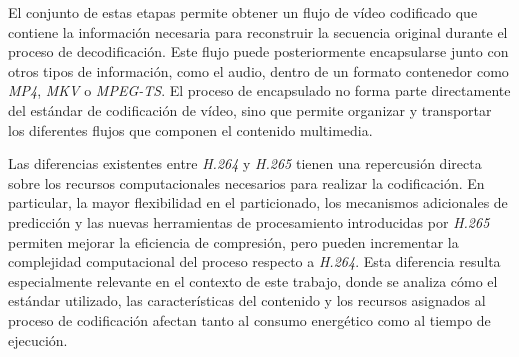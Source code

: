  El conjunto de estas etapas permite obtener un flujo de vídeo codificado que contiene la información necesaria para reconstruir la secuencia original durante el proceso de decodificación. Este flujo puede posteriormente encapsularse junto con otros tipos de información, como el audio, dentro de un formato contenedor como \textit{MP4}, \textit{MKV} o \textit{MPEG-TS}. El proceso de encapsulado no forma parte directamente del estándar de codificación de vídeo, sino que permite organizar y transportar los diferentes flujos que componen el contenido multimedia.
 
 Las diferencias existentes entre \textit{H.264} y \textit{H.265} tienen una repercusión directa sobre los recursos computacionales necesarios para realizar la codificación. En particular, la mayor flexibilidad en el particionado, los mecanismos adicionales de predicción y las nuevas herramientas de procesamiento introducidas por \textit{H.265} permiten mejorar la eficiencia de compresión, pero pueden incrementar la complejidad computacional del proceso respecto a \textit{H.264}. Esta diferencia resulta especialmente relevante en el contexto de este trabajo, donde se analiza cómo el estándar utilizado, las características del contenido y los recursos asignados al proceso de codificación afectan tanto al consumo energético como al tiempo de ejecución.

